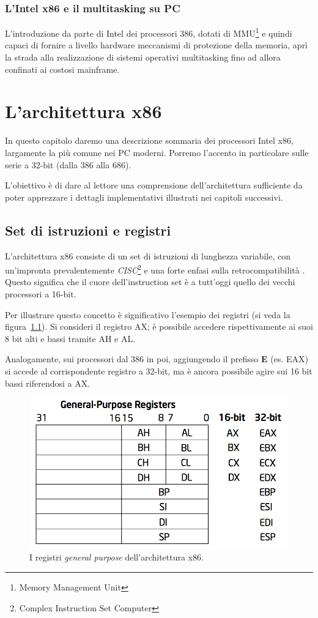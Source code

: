 \documentclass[12pt,a4paper]{report}
\begin{document}
		\subsection{L'Intel x86 e il multitasking su PC}
			L'introduzione da parte di Intel dei processori 386, dotati di MMU\footnote{Memory Management Unit} e quindi capaci di fornire a
			livello hardware meccanismi di protezione della memoria, aprì la strada alla realizzazione di sistemi operativi multitasking
			fino ad allora confinati ai costosi mainframe.

\chapter{L'architettura x86}
	In questo capitolo daremo una descrizione sommaria dei processori Intel x86, largamente la più comune nei PC moderni.
	Porremo l'accento in particolare sulle serie a 32-bit (dalla 386 alla 686).
	
	L'obiettivo è di dare al lettore una comprensione dell'architettura sufficiente da poter apprezzare i dettagli implementativi
	illustrati nei capitoli successivi.
	
	\section{Set di istruzioni e registri}
		L'architettura x86 consiste di un set di istruzioni di lunghezza variabile, con un'impronta prevalentemente
		\emph{CISC}\footnote{Complex Instruction Set Computer} e una forte enfasi sulla retrocompatibilità \cite{WIKI_x86}.
		Questo significa che il cuore dell'instruction set è a tutt'oggi quello dei vecchi processori a 16-bit.
		
		Per illustrare questo concetto è significativo l'esempio dei registri (si veda la figura~\ref{fig:gpr}).
		Si consideri il registro AX; è possibile accedere rispettivamente ai suoi 8 bit alti e bassi tramite AH e AL.
		
		Analogamente, sui processori dal 386 in poi, aggiungendo il prefisso \textbf{E} (es. EAX) si accede al corrispondente
		registro a 32-bit, ma è ancora possibile agire sui 16 bit bassi riferendosi a AX.
		
		\begin{figure}[t]
		\centering
		\includegraphics[scale=0.6]{img/gpr.png}
		\caption{I registri \emph{general purpose} dell'architettura x86. \cite{Intel}\label{fig:gpr}}
		\end{figure}
\end{document}
